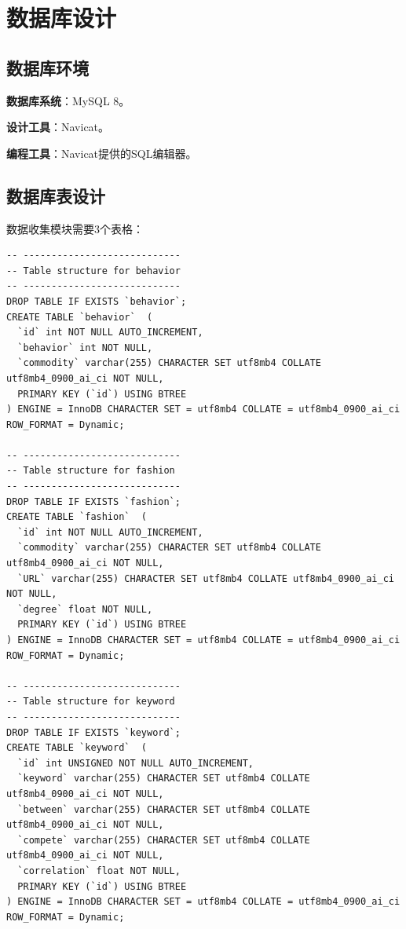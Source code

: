 \documentclass[11pt, a4paper, oneside]{ctexbook}
\begin{document}
\chapter{数据库设计}
\section{数据库环境}
\textbf{数据库系统}：MySQL 8。

\textbf{设计工具}：Navicat。

\textbf{编程工具}：Navicat提供的SQL编辑器。
\section{数据库表设计}
数据收集模块需要3个表格：
\begin{lstlisting}
-- ----------------------------
-- Table structure for behavior
-- ----------------------------
DROP TABLE IF EXISTS `behavior`;
CREATE TABLE `behavior`  (
  `id` int NOT NULL AUTO_INCREMENT,
  `behavior` int NOT NULL,
  `commodity` varchar(255) CHARACTER SET utf8mb4 COLLATE utf8mb4_0900_ai_ci NOT NULL,
  PRIMARY KEY (`id`) USING BTREE
) ENGINE = InnoDB CHARACTER SET = utf8mb4 COLLATE = utf8mb4_0900_ai_ci ROW_FORMAT = Dynamic;

-- ----------------------------
-- Table structure for fashion
-- ----------------------------
DROP TABLE IF EXISTS `fashion`;
CREATE TABLE `fashion`  (
  `id` int NOT NULL AUTO_INCREMENT,
  `commodity` varchar(255) CHARACTER SET utf8mb4 COLLATE utf8mb4_0900_ai_ci NOT NULL,
  `URL` varchar(255) CHARACTER SET utf8mb4 COLLATE utf8mb4_0900_ai_ci NOT NULL,
  `degree` float NOT NULL,
  PRIMARY KEY (`id`) USING BTREE
) ENGINE = InnoDB CHARACTER SET = utf8mb4 COLLATE = utf8mb4_0900_ai_ci ROW_FORMAT = Dynamic;

-- ----------------------------
-- Table structure for keyword
-- ----------------------------
DROP TABLE IF EXISTS `keyword`;
CREATE TABLE `keyword`  (
  `id` int UNSIGNED NOT NULL AUTO_INCREMENT,
  `keyword` varchar(255) CHARACTER SET utf8mb4 COLLATE utf8mb4_0900_ai_ci NOT NULL,
  `between` varchar(255) CHARACTER SET utf8mb4 COLLATE utf8mb4_0900_ai_ci NOT NULL,
  `compete` varchar(255) CHARACTER SET utf8mb4 COLLATE utf8mb4_0900_ai_ci NOT NULL,
  `correlation` float NOT NULL,
  PRIMARY KEY (`id`) USING BTREE
) ENGINE = InnoDB CHARACTER SET = utf8mb4 COLLATE = utf8mb4_0900_ai_ci ROW_FORMAT = Dynamic;
\end{lstlisting}
\end{document}
